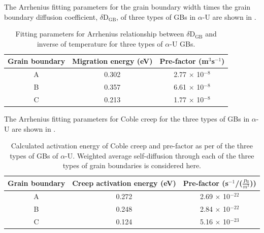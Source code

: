 \documentclass[review]{elsarticle}
\begin{document}
The Arrhenius fitting parameters for the grain boundary width times the grain boundary diffusion coefficient, $\delta$D$_\mathrm{GB}$, of three types of GBs in $\alpha$-U are shown in .

\begin{table}[h!]
\centering
\caption{ Fitting parameters for Arrhenius relationship between $\delta$D$_\mathrm{GB}$ and inverse of temperature for three types of $\alpha$-U GBs. \label{tab:widthanddiff}}
\begin{tabular}{|c|c|c|}
\hline
\multicolumn{1}{|c}{Grain boundary}
& \multicolumn{1}{|c}{Migration energy (eV) } & \multicolumn{1}{c|}{Pre-factor (m$^{3}$s$^{-1}$) } \\
\hline

A & 0.302 & 2.77 $\times$ 10$^{-8}$ \\
B & 0.357 & 6.61 $\times$ 10$^{-8}$ \\
C & 0.213 & 1.77 $\times$ 10$^{-8}$ \\

\hline
\end{tabular}
\end{table}


The Arrhenius fitting parameters for Coble creep for the three types of GBs in $\alpha$-U are shown in .
\begin{table}[h!]
\centering
\caption{Calculated activation energy of Coble creep and pre-factor as per  of the three types of GBs of $\alpha$-U. Weighted average self-diffusion through each of the three types of grain boundaries is considered here. \label{tab:creep}}
\begin{tabular}{|c|c|c|}
\hline
\multicolumn{1}{|c}{Grain boundary}
& \multicolumn{1}{|c}{Creep activation energy (eV) } & \multicolumn{1}{c|}{Pre-factor (s$^{-1}$/($\frac{Pa}{m^3}$)) } \\
\hline

A & 0.272 & 2.69 $\times$ 10$^{-22}$ \\
B & 0.248 & 2.84 $\times$ 10$^{-22}$ \\
C & 0.124 & 5.16 $\times$ 10$^{-23}$ \\

\hline
\end{tabular}
\end{table}



\end{document}
